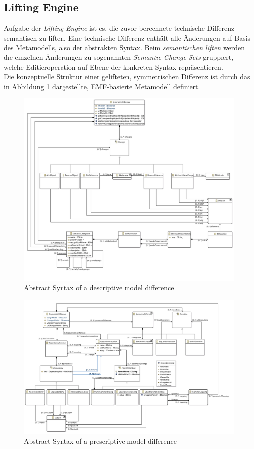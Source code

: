 \subsection{Lifting Engine}

Aufgabe der \textit{Lifting Engine} ist es, die zuvor berechnete technische Differenz semantisch zu liften.
Eine technische Differenz enthält alle Än\-der\-ung\-en  auf Basis des Metamodells, also der abstrakten Syntax.
Beim \textit{semantischen liften} werden die einzelnen Änderungen zu sogenannten \textit{Semantic Change Sets} gruppiert, welche Editieroperation auf Ebene der konkreten Syntax repräsentieren.\\
Die konzeptuelle Struktur einer gelifteten, symmetrischen Differenz ist durch das in Abbildung \ref{fig:symmetric_model} dargestellte, EMF-basierte Metamodell definiert. 

\begin{figure}[h!]
\centering
\includegraphics[width=\textwidth]{images/architecture/symmetric_model}
\caption{Abstract Syntax of a descriptive model difference}
\label{fig:symmetric_model}
\end{figure}


\begin{figure}[h!]
\centering
\includegraphics[width=\textwidth]{images/architecture/asymmetric_model}
\caption{Abstract Syntax of a prescriptive model difference}
\end{figure}

